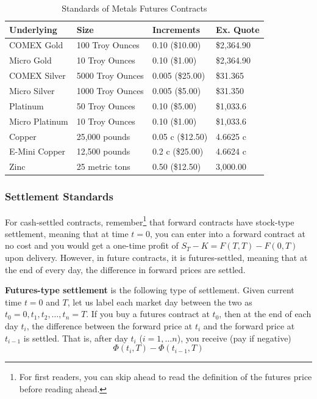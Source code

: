 \documentclass{article}
\begin{document}
      \begin{table}[H]
        \centering
        \begin{tabular}{|l|l|l|l|}
        \hline
        \textbf{Underlying} & \textbf{Size} & \textbf{Increments} & \textbf{Ex. Quote} \\ \hline
        COMEX Gold & 100 Troy Ounces & 0.10 (\$10.00) & \$2,364.90 \\ \hline 
        Micro Gold & 10 Troy Ounces & 0.10 (\$1.00) & \$2,364.90 \\ \hline
        COMEX Silver & 5000 Troy Ounces & 0.005 (\$25.00) & \$31.365 \\ \hline 
        Micro Silver & 1000 Troy Ounces & 0.005 (\$5.00) & \$31.350 \\ \hline 
        Platinum & 50 Troy Ounces & 0.10 (\$5.00) & \$1,033.6 \\ \hline 
        Micro Platinum & 10 Troy Ounces & 0.10 (\$1.00) & \$1,033.6 \\ \hline 
        Copper & 25,000 pounds & 0.05 c (\$12.50) & 4.6625 c \\ \hline
        E-Mini Copper & 12,500 pounds & 0.2 c (\$25.00) & 4.6624 c \\ \hline
        Zinc & 25 metric tons & 0.50 (\$12.50) & 3,000.00 \\ \hline
        \end{tabular}
        \caption{Standards of Metals Futures Contracts}
        \label{tab:metals}
      \end{table}

    \subsubsection{Settlement Standards}

      For cash-settled contracts, remember\footnote{For first readers, you can skip ahead to read the definition of the futures price before reading ahead.} that forward contracts have stock-type settlement, meaning that at time $t = 0$, you can enter into a forward contract at no cost and you would get a one-time profit of $S_T - K = F(T, T) - F(0, T)$ upon delivery. However, in future contracts, it is futures-settled, meaning that at the end of every day, the difference in forward prices are settled. 

      \begin{definition}
        \textbf{Futures-type settlement} is the following type of settlement. Given current time $t = 0$ and $T$, let us label each market day between the two as $t_0 = 0, t_1, t_2, \ldots, t_n = T$. If you buy a futures contract at $t_0$, then at the end of each day $t_i$, the difference between the forward price at $t_i$ and the forward price at $t_{i-1}$ is settled. That is, after day $t_i$ ($i = 1, \ldots n$), you receive (pay if negative) 
        \begin{equation}
          \Phi(t_i, T) - \Phi(t_{i-1}, T)
        \end{equation}
      \end{definition}
\end{document}
